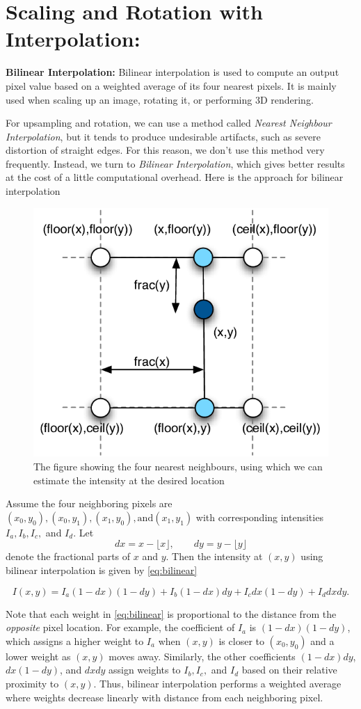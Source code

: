 \documentclass[12pt]{article}
\begin{document}
\section{Scaling and Rotation with Interpolation:}
\textbf{Bilinear Interpolation:} Bilinear interpolation is used to compute an output pixel value based on a weighted average of its four nearest pixels. It is mainly used when scaling up an image, rotating it, or performing 3D rendering.

For upsampling and rotation, we can use a method called \textit{Nearest Neighbour Interpolation}, but it tends to produce undesirable artifacts, such as severe distortion of straight edges. For this reason, we don't use this method very frequently. 
Instead, we turn to \textit{Bilinear Interpolation}, which gives better results at the cost of a little computational overhead.  
Here is the approach for bilinear interpolation
\begin{figure}[h]
    \centering
    \includegraphics[width=0.5\linewidth]{bilinear.png}
    \caption{The figure showing the four nearest neighbours, using which we can estimate the intensity at the desired location}
    \label{fig:bilinear}
\end{figure}

\noindent
Assume the four neighboring pixels are $(x_0, y_0), (x_0, y_1), (x_1, y_0), \text{and} (x_1, y_1)$ with corresponding intensities $I_a, I_b, I_c,$ and $I_d$.  
Let 
\[
dx = x - \lfloor x \rfloor, \qquad dy = y - \lfloor y \rfloor
\]
denote the fractional parts of $x$ and $y$.  
Then the intensity at $(x,y)$ using bilinear interpolation is given by \cref{eq:bilinear}

\begin{equation}
I(x,y) = I_a (1 - dx)(1 - dy) + I_b (1 - dx)dy + I_c dx(1 - dy) + I_d dx dy.
\label{eq:bilinear}
\end{equation}

\noindent
Note that each weight in \cref{eq:bilinear} is proportional to the distance from the \emph{opposite} pixel location. 
For example, the coefficient of $I_a$ is $(1 - dx)(1 - dy)$, which assigns a higher weight to $I_a$ when $(x,y)$ is closer to $(x_0, y_0)$ and a lower weight as $(x,y)$ moves away. 
Similarly, the other coefficients $(1 - dx)dy$, $dx(1 - dy)$, and $dxdy$ assign weights to $I_b, I_c,$ and $I_d$ based on their relative proximity to $(x,y)$. 
Thus, bilinear interpolation performs a weighted average where weights decrease linearly with distance from each neighboring pixel.
\end{document}
